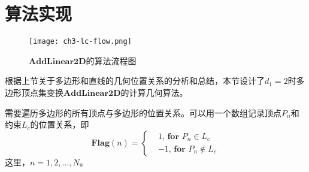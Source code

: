 \section{算法实现}\label{sect:3.3}
\begin{figure}[!h]
 \centering
 \texttt{[image: ch3-lc-flow.png]}\\	 %
 \caption{$\mathbf{AddLinear2D}$的算法流程图}
 \label{fig.3.ic.flow}
\end{figure}
根据上节关于多边形和直线的几何位置关系的分析和总结，本节设计了$d_{1}=2$时多边形顶点集变换$\mathbf{AddLinear2D}$的计算几何算法。

需要遍历多边形的所有顶点与多边形的位置关系。可以用一个数组记录顶点$P_{n}$和约束$L_{c}$的位置关系，即
\begin{equation}%
\mathbf{Flag}(n)=\left\{
\begin{array}{ll}
&1\textbf{, for }P_{n}\in L_{c}\\
&-1\textbf{, for }P_{n}\notin L_{c}
\end{array}
\right.
\end{equation}
这里，$n=1,2,\ldots,N$。

